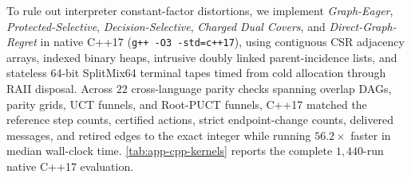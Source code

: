 \documentclass{article}
\theoremstyle{plain}
\theoremstyle{definition}
\begin{document}
To rule out interpreter constant-factor distortions, we implement \emph{Graph-Eager}, \emph{Protected-Selective}, \emph{Decision-Selective}, \emph{Charged Dual Covers}, and \emph{Direct-Graph-Regret} in native C++17 (\texttt{g++ -O3 -std=c++17}), using contiguous CSR adjacency arrays, indexed binary heaps, intrusive doubly linked parent-incidence lists, and stateless 64-bit SplitMix64 terminal tapes timed from cold allocation through RAII disposal. Across $22$ cross-language parity checks spanning overlap DAGs, parity grids, UCT funnels, and Root-PUCT funnels, C++17 matched the reference step counts, certified actions, strict endpoint-change counts, delivered messages, and retired edges to the exact integer while running $56.2\times$ faster in median wall-clock time. \cref{tab:app-cpp-kernels} reports the complete $1{,}440$-run native C++17 evaluation.
\end{document}
